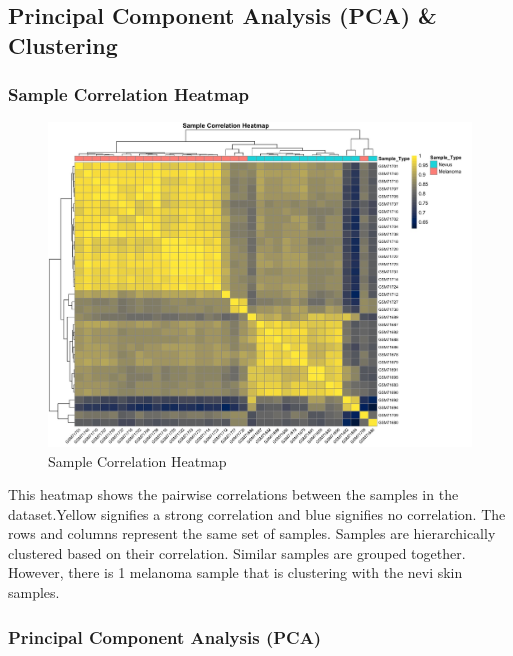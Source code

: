 \documentclass[
]{article}
\begin{document}
\newpage

\subsection{Principal Component Analysis (PCA) \&
Clustering}\label{principal-component-analysis-pca-clustering}

\subsubsection{Sample Correlation
Heatmap}\label{sample-correlation-heatmap}

\begin{figure}

{\centering \includegraphics[width=1\linewidth]{Images/Heatmap} 

}

\caption{Sample Correlation Heatmap}\label{fig:unnamed-chunk-26}
\end{figure}

This heatmap shows the pairwise correlations between the samples in the
dataset.Yellow signifies a strong correlation and blue signifies no
correlation. The rows and columns represent the same set of samples.
Samples are hierarchically clustered based on their correlation. Similar
samples are grouped together. However, there is 1 melanoma sample that
is clustering with the nevi skin samples.

\subsubsection{Principal Component Analysis
(PCA)}\label{principal-component-analysis-pca}
\end{document}
